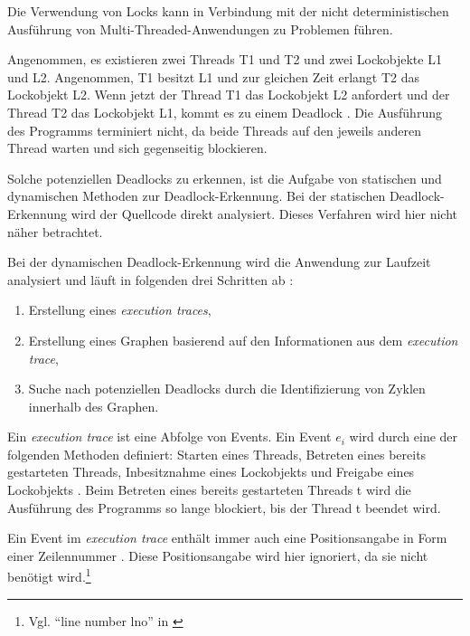 Die Verwendung von Locks kann in Verbindung mit der nicht deterministischen
Ausführung von Multi-Threaded-Anwendungen zu Problemen führen.

Angenommen, es existieren zwei Threads \textrm{T1} und \textrm{T2} und zwei
Lockobjekte \textrm{L1} und \textrm{L2}. Angenommen, \textrm{T1} besitzt
\textrm{L1} und zur gleichen Zeit erlangt \textrm{T2} das Lockobjekt
\textrm{L2}. Wenn jetzt der Thread \textrm{T1} das Lockobjekt \textrm{L2}
anfordert und der Thread \textrm{T2} das Lockobjekt \textrm{L1}, kommt es zu
einem Deadlock \autocite[vgl.][70]{coffman1971system}. Die Ausführung des
Programms terminiert nicht, da beide Threads auf den jeweils anderen Thread
warten und sich gegenseitig blockieren.

Solche potenziellen Deadlocks zu erkennen, ist die Aufgabe von statischen und
dynamischen Methoden zur Deadlock-Erkennung. Bei der statischen
Deadlock-Erkennung wird der Quellcode direkt analysiert. Dieses Verfahren wird
hier nicht näher betrachtet.

Bei der dynamischen Deadlock-Erkennung wird die Anwendung zur Laufzeit
analysiert und läuft in folgenden drei Schritten ab
\autocite[vgl.][212-213]{bensalem2005dynamic}:
\begin{enumerate}
  \item Erstellung eines \emph{execution traces},
  \item Erstellung eines Graphen basierend auf den Informationen aus dem
  \emph{execution trace},
  \item Suche nach potenziellen Deadlocks durch die Identifizierung von Zyklen
  innerhalb des Graphen.
\end{enumerate}
Ein \emph{execution trace} ist eine Abfolge von Events. Ein Event \textrm{$e_i$}
wird durch eine der folgenden Methoden definiert: Starten eines Threads,
Betreten eines bereits gestarteten Threads, Inbesitznahme eines Lockobjekts und
Freigabe eines Lockobjekts \autocite[vgl.][212]{bensalem2005dynamic}. Beim
Betreten eines bereits gestarteten Threads \textrm{t} wird die Ausführung des
Programms so lange blockiert, bis der Thread \textrm{t} beendet wird.

Ein Event im \emph{execution trace} enthält immer auch eine Positionsangabe in
Form einer Zeilennummer \autocite[vgl.][212]{bensalem2005dynamic}. Diese
Positionsangabe  wird hier ignoriert, da sie nicht benötigt wird.\footnote{Vgl.
"`line number lno"' in \autocite[212]{bensalem2005dynamic}}

